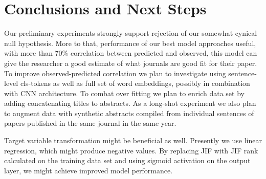 \documentclass[11pt]{article}
\begin{document}
\section{Conclusions and Next Steps}
Our preliminary experiments strongly support rejection of our somewhat cynical null hypothesis. More to that, performance of our best model approaches useful, with more than 70\% correlation between predicted and observed, this model can give the researcher a good estimate of what journals are good fit for their paper. 
To improve observed-predicted correlation we plan to investigate using sentence-level cls-tokens as well as full set of word embeddings, possibly in combination with CNN architecture. To combat over fitting we plan to enrich data set by adding concatenating titles to abstracts. As a long-shot experiment we also plan to augment data with synthetic abstracts compiled from individual sentences of papers published in the same journal in the same year.

Target variable transformation might be beneficial as well. Presently we use linear regression, which might produce negative values. By replacing JIF with JIF rank calculated on the training data set and using sigmoid activation on the output layer, we might achieve improved model performance. 



\end{document}

